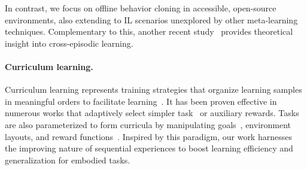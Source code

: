 \documentclass{article}
\newcommand{\para}[1]{\paragraph{#1}\looseness=-1}
\begin{document}
In contrast, we focus on offline behavior cloning in accessible, open-source environments, also extending to IL scenarios unexplored by other meta-learning techniques.
Complementary to this, another recent study~\citep{lee2023supervised} provides theoretical insight into cross-episodic learning.
\vspace{-0.5em}
\para{Curriculum learning.}
Curriculum learning represents training strategies that organize learning samples in meaningful orders to facilitate learning~\citep{bengio2009curriculum}.
It has been proven effective in numerous works that adaptively select simpler task~\citep{Narvekar2017AutonomousTS, Svetlik2017AutomaticCG, riedmiller2018learning, Peng2018CurriculumDF, Czarnecki2018MixMatchA, matiisen2019teacher, narvekar2019learning, Lin2019AdaptiveAT} or auxiliary rewards\citep{Jaderberg2017ReinforcementLW, shen2019situational}. Tasks are also parameterized to form curricula by manipulating goals~\citep{Forestier2017IntrinsicallyMG, Held2018AutomaticGG, Racanire2020AutomatedCG}, environment layouts\citep{wohlke2020performance, baker2019emergent, Portelas2019TeacherAF}, and reward functions~\citep{Gupta2018UnsupervisedMF, Jabri2019UnsupervisedCF}.
Inspired by this paradigm, our work harnesses the improving nature of sequential experiences to boost learning efficiency and generalization for embodied tasks.
\vspace{-0.5em}
\end{document}
